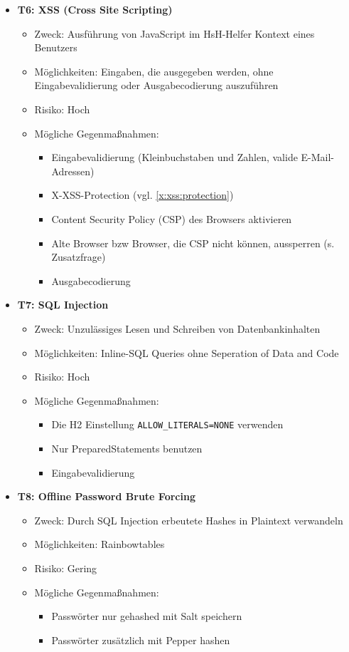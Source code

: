 \documentclass[12pt,DIV14,BCOR10mm,a4paper,parskip=half-,headsepline,headinclude,english,ngerman,bibliography=totocnumbered]{scrreprt}
\begin{document}
\begin{itemize}
  \hypertarget{threat6}{}
  \item \textbf{T6: XSS (Cross Site Scripting)}
  \begin{itemize}
  \item Zweck: Ausführung von JavaScript im HsH-Helfer Kontext eines Benutzers
  \item Möglichkeiten: Eingaben, die ausgegeben werden, ohne Eingabevalidierung oder Ausgabecodierung auszuführen
  \item Risiko: Hoch
  \item Mögliche Gegenmaßnahmen:
	\begin{itemize}
		\item Eingabevalidierung (Kleinbuchstaben und Zahlen, valide E-Mail-Adressen)
		\item X-XSS-Protection (vgl. \ref{x:xss:protection})
		\item Content Security Policy (CSP) des Browsers aktivieren
		\item Alte Browser bzw Browser, die CSP nicht können, aussperren (s. Zusatzfrage) %
		\item Ausgabecodierung
	\end{itemize}
  \end{itemize}

  \hypertarget{threat7}{}
  \item \textbf{T7: SQL Injection}
  \begin{itemize}
  \item Zweck: Unzulässiges Lesen und Schreiben von Datenbankinhalten
  \item Möglichkeiten: Inline-SQL Queries ohne Seperation of Data and Code
  \item Risiko: Hoch
  \item Mögliche Gegenmaßnahmen:
  \begin{itemize}
    \item Die H2 Einstellung \texttt{ALLOW\_LITERALS=NONE} verwenden
    \item Nur PreparedStatements benutzen
    \item Eingabevalidierung
  \end{itemize}
  \end{itemize}

  \hypertarget{threat8}{}
  \item \textbf{T8: Offline Password Brute Forcing}
  \begin{itemize}
  \item Zweck: Durch SQL Injection erbeutete Hashes in Plaintext verwandeln
  \item Möglichkeiten: Rainbowtables
  \item Risiko: Gering
  \item Mögliche Gegenmaßnahmen:
  \begin{itemize}
    \item Passwörter nur gehashed mit Salt speichern
    \item Passwörter zusätzlich mit Pepper hashen
  \end{itemize}
  \end{itemize}


\end{itemize}
\end{document}
